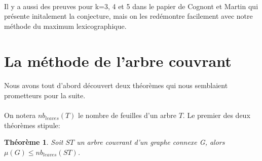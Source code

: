 \documentclass[a4paper]{article}
\newtheorem{theorem}{Théorème}
\theoremstyle{definition}
\theoremstyle{remark}
\begin{document}
\paragraph{}
Il y a aussi des preuves pour k=3, 4 et 5 dans le papier de Cognont et
Martin qui présente initalement la conjecture, mais on les redémontre facilement avec notre méthode du maximum lexicographique.

\section{La méthode de l'arbre couvrant}

\paragraph{}
Nous avons tout d'abord découvert deux théorèmes qui nous semblaient prometteurs pour la suite.

\paragraph{}
On notera $nb_{leaves}(T)$ le nombre de feuilles d'un arbre $T$. Le premier des deux théorèmes stipule:
\begin{theorem}
Soit $ST$ un arbre couvrant d'un graphe connexe G, alors $\mu(G) \leq nb_{leaves}(ST)$.
\end{theorem}
\end{document}
